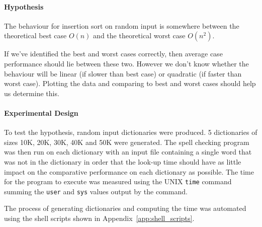 \documentclass[a4]{article}
\begin{document}
\paragraph{Hypothesis} The behaviour for insertion sort on random input is somewhere between the theoretical best case $O(n)$ and the theoretical worst case $O(n^2)$.  

If we've identified the best and worst cases correctly, then average case performance should lie between these two.  However we don't know whether the behaviour will be linear (if slower than best case) or quadratic (if faster than worst case).  Plotting the data and comparing to best and worst cases should help us determine this.

\paragraph{Experimental Design} To test the hypothesis, random input dictionaries were produced. 5 dictionaries of sizes 10K, 20K, 30K, 40K and 50K were generated.  The spell checking program was then run on each dictionary with an input file containing a single word that was not in the dictionary in order that the look-up time should have as little impact on the comparative performance on each dictionary as possible.  The time for the program to execute was measured using the UNIX \texttt{time} command summing the \texttt{user} and \texttt{sys} values output by the command.  

The process of generating dictionaries and computing the time was automated using the shell scripts shown in Appendix~\ref{app:shell_scripts}.
\end{document}
